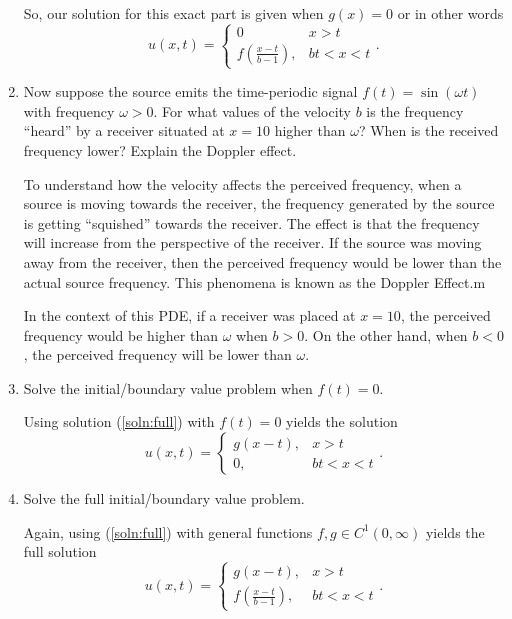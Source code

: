\documentclass[a4paper,12pt]{article}
\begin{document}
\begin{enumerate}[label = \textbf{(\alph*)}]
        So, our solution for this exact part is given when $ g(x) = 0 $ or in other words
        \[
            u(x,t) = 
            \begin{cases}
                0 & x > t \\
                f(\frac{x - t}{b - 1}), & bt < x < t
            \end{cases}.
        \]
        
        \item Now suppose the source emits the time-periodic signal $ f(t) = \sin(\omega t) $ with frequency $ \omega > 0 $. For what values of the velocity $ b $ is the frequency ``heard'' by a receiver situated at $ x = 10 $ higher than $ \omega $? When is the received frequency lower? Explain the Doppler effect.
        
        To understand how the velocity affects the perceived frequency, when a source is moving towards the receiver, the frequency generated by the source is getting ``squished'' towards the receiver. The effect is that the frequency will increase from the perspective of the receiver. If the source was moving away from the receiver, then the perceived frequency would be lower than the actual source frequency. This phenomena is known as the Doppler Effect.m
        
        In the context of this PDE, if a receiver was placed at $ x = 10 $, the perceived frequency would be higher than $ \omega $ when $ b > 0 $. On the other hand, when $ b < 0 $, the perceived frequency will be lower than $ \omega $.
        
        \item Solve the initial/boundary value problem when $ f(t) = 0 $.
        
        Using solution (\ref{soln:full}) with $ f(t) = 0 $ yields the solution
        \[
            u(x,t) = 
            \begin{cases}
                g(x - t), & x > t \\
                0, & bt < x < t
            \end{cases}.
        \]
        
        \item Solve the full initial/boundary value problem.
        
        Again, using (\ref{soln:full}) with general functions $ f,g \in C^1(0, \infty) $ yields the full solution
        \[
            u(x,t) = 
                \begin{cases}
                    g(x - t), & x > t \\
                    f(\frac{x - t}{b - 1}), & bt < x < t
                \end{cases}.
        \]
        

\end{enumerate}
\end{document}
